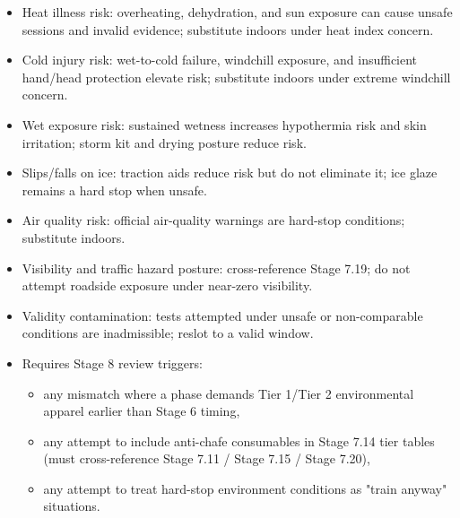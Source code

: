\documentclass[10pt]{article}
\begin{document}
\begin{itemize}
\item Heat illness risk: overheating, dehydration, and sun exposure can cause unsafe sessions and invalid evidence; substitute indoors under heat index concern.
\item Cold injury risk: wet-to-cold failure, windchill exposure, and insufficient hand/head protection elevate risk; substitute indoors under extreme windchill concern.
\item Wet exposure risk: sustained wetness increases hypothermia risk and skin irritation; storm kit and drying posture reduce risk.
\item Slips/falls on ice: traction aids reduce risk but do not eliminate it; ice glaze remains a hard stop when unsafe.
\item Air quality risk: official air-quality warnings are hard-stop conditions; substitute indoors.
\item Visibility and traffic hazard posture: cross-reference Stage 7.19; do not attempt roadside exposure under near-zero visibility.
\item Validity contamination: tests attempted under unsafe or non-comparable conditions are inadmissible; reslot to a valid window.
\item Requires Stage 8 review triggers:
  \begin{itemize}
  \item any mismatch where a phase demands Tier 1/Tier 2 environmental apparel earlier than Stage 6 timing,
  \item any attempt to include anti-chafe consumables in Stage 7.14 tier tables (must cross-reference Stage 7.11 / Stage 7.15 / Stage 7.20),
  \item any attempt to treat hard-stop environment conditions as "train anyway" situations.
  \end{itemize}
\end{itemize}
\end{document}
